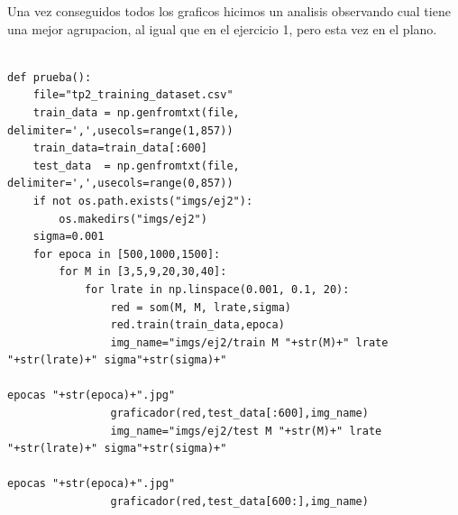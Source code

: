 Una vez conseguidos todos los graficos hicimos un analisis observando cual tiene una mejor agrupacion, al igual que en el ejercicio 1, pero esta vez en el plano.


\begin{lstlisting}[caption=pruebas]
	
def prueba():
	file="tp2_training_dataset.csv"
	train_data = np.genfromtxt(file, delimiter=',',usecols=range(1,857))
	train_data=train_data[:600]
	test_data  = np.genfromtxt(file, delimiter=',',usecols=range(0,857))
	if not os.path.exists("imgs/ej2"):
		os.makedirs("imgs/ej2")
	sigma=0.001
	for epoca in [500,1000,1500]:
		for M in [3,5,9,20,30,40]:
			for lrate in np.linspace(0.001, 0.1, 20):
				red = som(M, M, lrate,sigma)
				red.train(train_data,epoca)
				img_name="imgs/ej2/train M "+str(M)+" lrate "+str(lrate)+" sigma"+str(sigma)+" 
				                                                    epocas "+str(epoca)+".jpg"
				graficador(red,test_data[:600],img_name)
				img_name="imgs/ej2/test M "+str(M)+" lrate "+str(lrate)+" sigma"+str(sigma)+" 
				                                                   epocas "+str(epoca)+".jpg"
				graficador(red,test_data[600:],img_name)

\end{lstlisting}

